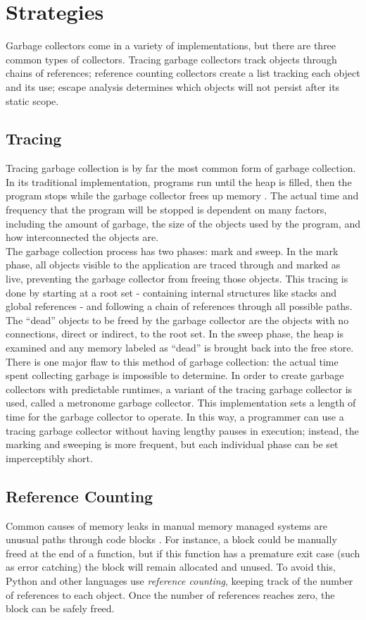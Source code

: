 \documentclass[12pt]{article}
\begin{document}
\section{Strategies}
Garbage collectors come in a variety of implementations, but there are three common types of collectors. Tracing garbage collectors track objects through chains of references; reference counting collectors create a list tracking each object and its use; escape analysis determines which objects will not persist after its static scope.
\subsection{Tracing}
Tracing garbage collection is by far the most common form of garbage collection. In its traditional implementation, programs run until the heap is filled, then the program stops while the garbage collector frees up memory \cite{ibmJava}. The actual time and frequency that the program will be stopped is dependent on many factors, including the amount of garbage, the size of the objects used by the program, and how interconnected the objects are.\\

The garbage collection process has two phases: mark and sweep. In the mark phase, all objects visible to the application are traced through and marked as live, preventing the garbage collector from freeing those objects. This tracing is done by starting at a root set - containing internal structures like stacks and global references - and following a chain of references through all possible paths. The ``dead'' objects to be freed by the garbage collector are the objects with no connections, direct or indirect, to the root set. In the sweep phase, the heap is examined and any memory labeled as ``dead'' is brought back into the free store.\\

There is one major flaw to this method of garbage collection: the actual time spent collecting garbage is impossible to determine. In order to create garbage collectors with predictable runtimes, a variant of the tracing garbage collector is used, called a metronome garbage collector. This implementation sets a length of time for the garbage collector to operate. In this way, a programmer can use a tracing garbage collector without having lengthy pauses in execution; instead, the marking and sweeping is more frequent, but each individual phase can be set imperceptibly short.
\subsection{Reference Counting}
Common causes of memory leaks in manual memory managed systems are unusual paths through code blocks \cite{pythDocs}. For instance, a block could be manually freed at the end of a function, but if this function has a premature exit case (such as error catching) the block will remain allocated and unused. To avoid this, Python and other languages use {\it reference counting}, keeping track of the number of references to each object. Once the number of references reaches zero, the block can be safely freed.\\
\end{document}
